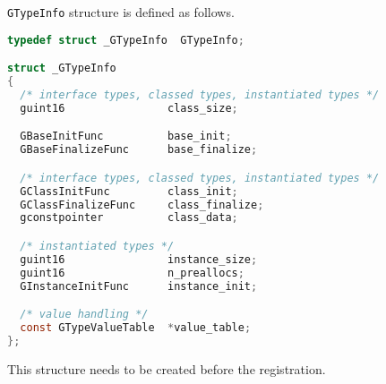 \passthrough{\lstinline!GTypeInfo!} structure is defined as follows.

\begin{lstlisting}[language=C]
typedef struct _GTypeInfo  GTypeInfo;

struct _GTypeInfo
{
  /* interface types, classed types, instantiated types */
  guint16                class_size;

  GBaseInitFunc          base_init;
  GBaseFinalizeFunc      base_finalize;

  /* interface types, classed types, instantiated types */
  GClassInitFunc         class_init;
  GClassFinalizeFunc     class_finalize;
  gconstpointer          class_data;

  /* instantiated types */
  guint16                instance_size;
  guint16                n_preallocs;
  GInstanceInitFunc      instance_init;

  /* value handling */
  const GTypeValueTable  *value_table;
};
\end{lstlisting}

This structure needs to be created before the registration.

